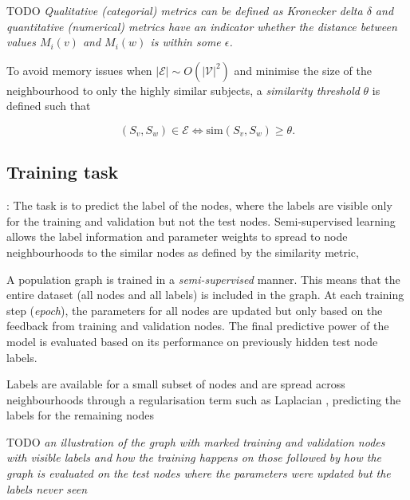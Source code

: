 TODO \textit{Qualitative (categorial) metrics can be defined as Kronecker delta $\delta$ and quantitative (numerical) metrics have an indicator whether the distance between values $M_i(v)$ and $M_i(w)$ is within some $\epsilon$.}

To avoid memory issues when $|\mathcal{E}| \sim O(|\mathcal{V}|^2)$ and minimise the size of the neighbourhood to only the highly similar subjects, a \textit{similarity threshold} $\theta$ is defined such that

\begin{equation}
    (S_v, S_w) \in \mathcal{E} \iff \mathrm{sim}(S_v, S_w) \geq \theta.
\end{equation}

\subsection{Training task}
\cite{kipf2017semi}: The task is to predict the label of the nodes, where the labels are visible only for the training and validation but not the test nodes. Semi-supervised learning allows the label information and parameter weights to spread to node neighbourhoods to the similar nodes as defined by the similarity metric, 

A population graph is trained in a \textit{semi-supervised} manner. This means that the entire dataset (all nodes and all labels) is included in the graph. At each training step (\textit{epoch}), the parameters for all nodes are updated but only based on the feedback from training and validation nodes. The final predictive power of the model is evaluated based on its performance on previously hidden test node labels.

Labels are available for a small subset of nodes and are spread across neighbourhoods through a regularisation term such as Laplacian \cite{kipf2017semi}, predicting the labels for the remaining nodes

TODO \textit{an illustration of the graph with marked training and validation nodes with visible labels and how the training happens on those followed by how the graph is evaluated on the test nodes where the parameters were updated but the labels never seen}


